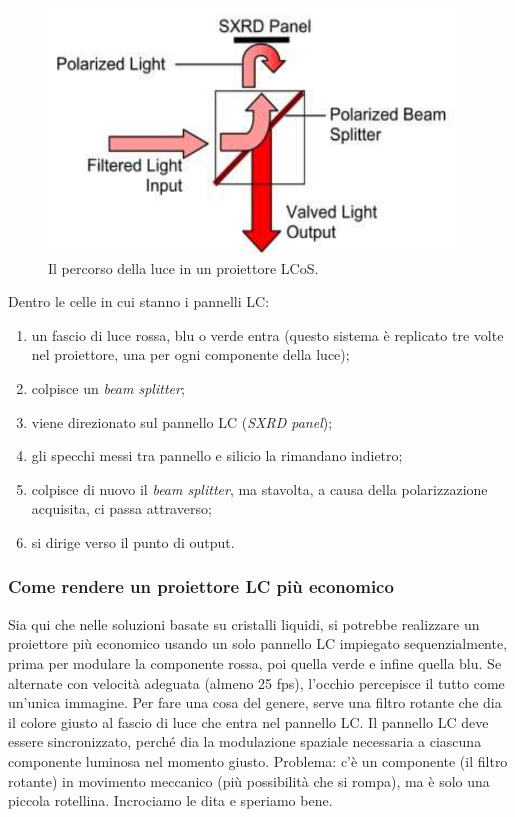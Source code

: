\documentclass[a4paper,11pt]{article}
\begin{document}
\renewcommand{\thefigure}{4.26}
\begin{figure}[!h]
  \centering
    \includegraphics[scale=0.55]{images/4/lcos_path.png}
    \caption{Il percorso della luce in un proiettore LCoS.}
\end{figure}

Dentro le celle in cui stanno i pannelli LC:
\begin{enumerate}
    \item un fascio di luce rossa, blu o verde entra (questo sistema è replicato tre volte nel proiettore, una per ogni componente della luce);
    \item colpisce un \textit{beam splitter};
    \item viene direzionato sul pannello LC (\textit{SXRD panel});
    \item gli specchi messi tra pannello e silicio la rimandano indietro;
    \item colpisce di nuovo il \textit{beam splitter}, ma stavolta, a causa della polarizzazione acquisita, ci passa attraverso;
    \item si dirige verso il punto di output.
\end{enumerate}

\subsubsection{Come rendere un proiettore LC più economico}
Sia qui che nelle soluzioni basate su cristalli liquidi, si potrebbe realizzare un proiettore
più economico usando un solo pannello LC impiegato sequenzialmente, prima per modulare la componente rossa, poi quella verde e
infine quella blu. Se alternate con velocità adeguata (almeno 25 fps), l'occhio percepisce il tutto come un'unica immagine.
Per fare una cosa del genere, serve una filtro rotante che dia il colore giusto al fascio di luce che entra nel pannello LC.
Il pannello LC deve essere sincronizzato, perché dia la modulazione spaziale necessaria a ciascuna componente luminosa
nel momento giusto.
Problema: c'è un componente (il filtro rotante) in movimento meccanico (più possibilità che si rompa), ma è solo una piccola rotellina. Incrociamo le dita e speriamo bene.
\end{document}
